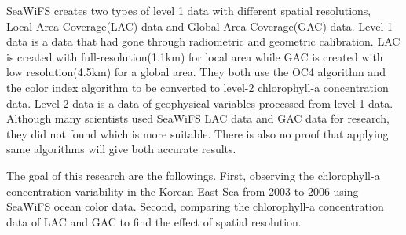 SeaWiFS creates two types of level 1 data with different spatial resolutions, Local-Area Coverage(LAC) data and Global-Area Coverage(GAC) data. Level-1 data is a data that had gone through radiometric and geometric calibration. LAC is created with full-resolution(1.1km) for local area while GAC is created with low resolution(4.5km) for a global area. They both use the OC4 algorithm and the color index algorithm to be converted to level-2 chlorophyll-a concentration data. Level-2 data is a data of geophysical variables processed from level-1 data. 
Although many scientists used SeaWiFS LAC data and GAC data for research, they did not found which is more suitable. There is also no proof that applying same algorithms will give both accurate results. 

The goal of this research are the followings. First, observing the chlorophyll-a concentration variability in the Korean East Sea from 2003 to 2006 using SeaWiFS ocean color data. Second, comparing the chlorophyll-a concentration data of LAC and GAC to find the effect of spatial resolution.


